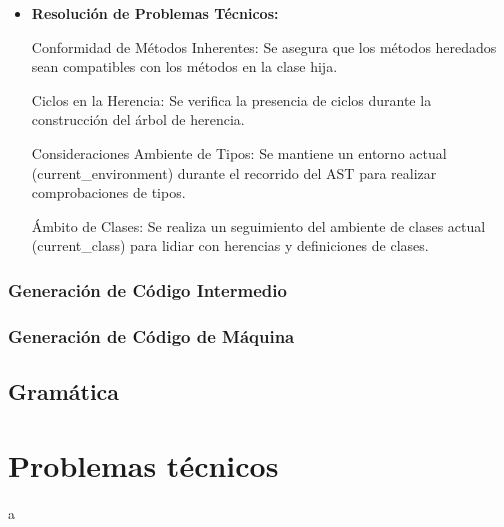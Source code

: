\documentclass[10pt]{article} %
\begin{document}
\begin{itemize}
	\item \textbf{Resolución de Problemas Técnicos:}
	
	Conformidad de Métodos Inherentes: Se asegura que los métodos heredados sean compatibles con los métodos en la clase hija.
	
	Ciclos en la Herencia: Se verifica la presencia de ciclos durante la construcción del árbol de herencia.
	
	Consideraciones
	Ambiente de Tipos: Se mantiene un entorno actual (current\_environment) durante el recorrido del AST para realizar comprobaciones de tipos.
	
	Ámbito de Clases: Se realiza un seguimiento del ambiente de clases actual (current\_class) para lidiar con herencias y definiciones de clases.
	
	\end{itemize}
	
	\subsubsection{Generaci\'on de C\'odigo Intermedio}
	
	\subsubsection{Generaci\'on de C\'odigo de M\'aquina}
	
	\subsection{Gram\'atica}
	
	\section{Problemas técnicos}
	
	\begin{thebibliography}
		a
	\end{thebibliography}
\end{document}
